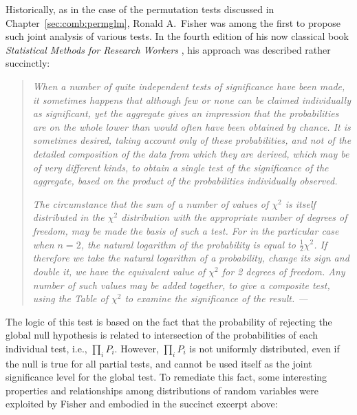Historically, as in the case of the permutation tests discussed in Chapter~\ref{sec:comb:permglm}, Ronald A.\ Fisher was among the first to propose such joint analysis of various tests. In the fourth edition of his now classical book \textit{Statistical Methods for Research Workers} \citep{Fisher1932}, his approach was described rather succinctly:

\begin{quote}
\emph{When a number of quite independent tests of significance have been made, it sometimes happens that although few or none can be claimed individually as significant, yet the aggregate gives an impression that the probabilities are on the whole lower than would often have been obtained by chance. It is sometimes desired, taking account only of these probabilities, and not of the detailed composition of the data from which they are derived, which may be of very different kinds, to obtain a single test of the significance of the aggregate, based on the product of the probabilities individually observed.}

\emph{The circumstance that the sum of a number of values of $\chi^{2}$ is itself distributed in the $\chi^{2}$ distribution with the appropriate number of degrees of freedom, may be made the basis of such a test. For in the particular case when $n=2$, the natural logarithm of the probability is equal to $\frac{1}{2}\chi^{2}$. If therefore we take the natural logarithm of a probability, change its sign and double it, we have the equivalent value of $\chi^{2}$ for 2 degrees of freedom. Any number of such values may be added together, to give a composite test, using the Table of $\chi^{2}$ to examine the significance of the result. \hfill --- \citet{Fisher1932}}
\end{quote}

The logic of this test is based on the fact that the probability of rejecting the global null hypothesis is related to intersection of the probabilities of each individual test, i.e., $\prod_{i} P_{i}$. However, $\prod_{i} P_{i}$ is not uniformly distributed, even if the null is true for all partial tests, and cannot be used itself as the joint significance level for the global test. To remediate this fact, some interesting properties and relationships among distributions of random variables were exploited by Fisher and embodied in the succinct excerpt above:

